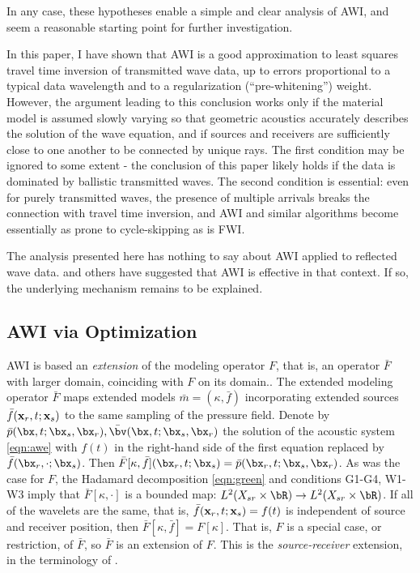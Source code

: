 In any case, these hypotheses enable a simple and clear
analysis of AWI, and seem a reasonable starting point for further
investigation.

In this paper, I have shown that AWI is a good approximation to least
squares travel time inversion of transmitted wave data, up to errors proportional to a typical
data wavelength and to a regularization (``pre-whitening'')
weight. However, the argument leading to this conclusion works only if
the material model is assumed slowly varying so that geometric
acoustics accurately describes the solution of the wave equation, and if
sources and receivers are sufficiently close to one another to be
connected by unique rays. The first condition may be ignored to some
extent - the conclusion of this paper likely holds if the data is
dominated by ballistic transmitted waves. The second condition
is essential: even for purely transmitted waves, the presence of
multiple arrivals breaks the connection
with travel time inversion, and AWI and similar algorithms
become essentially as prone to cycle-skipping as is FWI.


The analysis presented here has nothing to say about AWI applied to
reflected wave data. \cite{Warner:16} and others have
suggested that AWI is effective in that context. If so, the underlying
mechanism remains to be explained.


\subsection{AWI via Optimization}

AWI is based an {\em extension} of the modeling operator $F$, that is,
an operator ${\bar F}$ with larger domain, coinciding with $F$ on its domain..
The extended modeling operator ${\bar F}$ maps extended models
$\bar{m}=(\kappa,\bar{f})$ incorporating extended sources
$\bar{f}({\bf x}_r,t;{\bf x}_s)$ to the same sampling of the pressure
field. Denote by $\bar{p}(\bx,t;\bx_s,\bx_r), \bar{\bv}(\bx,t;\bx_s,\bx_r)$
the solution of the acoustic system \ref{eqn:awe} with $f(t)$ in the
right-hand side of the first equation replaced by
$\bar{f}(\bx_r,\cdot;\bx_s)$. Then
$\bar{F}[\kappa,\bar{f}](\bx_r,t;\bx_s) =
\bar{p}(\bx_r,t;\bx_s,\bx_r)$. As was the case for $F$, the Hadamard
decomposition \ref{eqn:green} and conditions G1-G4, W1-W3 imply that
$\bar{F}[\kappa, \cdot]$ is a bounded map: $L^2(X_{sr} \times \bR)
\rightarrow L^2(X_{sr} \times \bR)$. If all  
of the wavelets are the same, that is, ${\bar f}({\bf  
  x}_r,t;{\bf x}_s) = f(t)$ is independent of source and receiver  
position, then ${\bar F}[\kappa,\bar{f}] = F[\kappa]$. That is, $F$ is a special
case, or restriction, of ${\bar F}$, so ${\bar F}$ is an extension of
$F$. This is the {\em source-receiver} extension, in the terminology of \cite{HuangSymes2015SEG}.

